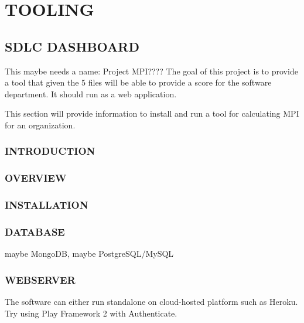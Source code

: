 \documentclass[SDSUThesis.tex]{subfiles}
\begin{document}
\section{TOOLING}

\subsection{SDLC DASHBOARD}
This maybe needs a name: Project MPI????  The goal of this project is to provide a tool that
given the 5 files will be able to provide a score for the software department.  It should run 
as a web application.

This section will provide information to install and run a tool for calculating MPI for an organization.
\subsubsection{INTRODUCTION}
\subsubsection{OVERVIEW}
\subsubsection{INSTALLATION}
\subsubsection{DATABASE}
maybe MongoDB, maybe PostgreSQL/MySQL
\subsubsection{WEBSERVER}
The software can either run standalone on cloud-hosted platform such as Heroku.  Try using Play Framework 2 with Authenticate.
\end{document}
